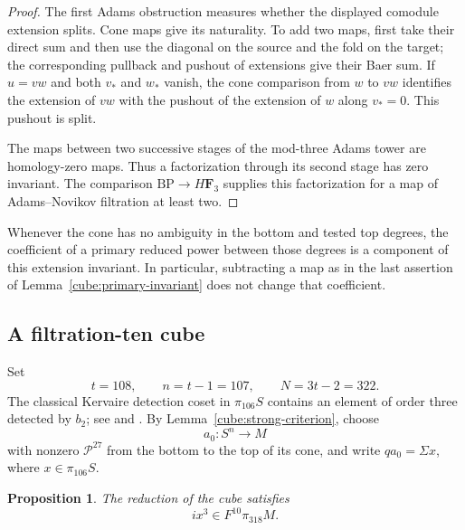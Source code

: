 \documentclass[11pt]{article}
\newtheorem{proposition}[theorem]{Proposition}
\theoremstyle{definition}
\theoremstyle{remark}
\numberwithin{equation}{section}
\begin{document}
\begin{proof}
The first Adams obstruction measures whether the displayed comodule
extension splits.  Cone maps give its naturality.  To add two maps,
first take their direct sum and then use the diagonal on the source
and the fold on the target; the corresponding pullback and pushout of
extensions give their Baer sum.  If \(u=vw\) and both \(v_*\) and
\(w_*\) vanish, the cone comparison from \(w\) to \(vw\) identifies
the extension of \(vw\) with the pushout of the extension of \(w\)
along \(v_*=0\).  This pushout is split.

The maps between two successive stages of the mod-three Adams tower
are homology-zero maps.  Thus a factorization through its second stage
has zero invariant.  The comparison \(\mathrm{BP}\to H\mathbf F_3\) supplies this
factorization for a map of Adams--Novikov filtration at least two.
\end{proof}

Whenever the cone has no ambiguity in the bottom and tested top
degrees, the coefficient of a primary reduced power between those
degrees is a component of this extension invariant.  In particular,
subtracting a map as in the last assertion of
Lemma~\ref{cube:primary-invariant} does not change that coefficient.

\subsection{A filtration-ten cube}

Set
\begin{equation}\label{cube:dimensions}
 t=108,\qquad n=t-1=107,\qquad N=3t-2=322.
\end{equation}
The classical Kervaire detection coset in \(\pi_{106}S\) contains
an element of order three detected by
\(b_2\); see \cite[Corollary~1.2 and its proof]{Amelotte} and
\cite[Table~A3.4]{Ravenel}.  By
Lemma~\ref{cube:strong-criterion}, choose
\[
 a_0:S^n\longrightarrow M
\]
with nonzero \(\mathcal P^{27}\) from the bottom to the top of its cone,
and write \(qa_0=\Sigma x\), where \(x\in\pi_{106}S\).

\begin{proposition}\label{cube:cubic-filtration}
The reduction of the cube satisfies
\[
 ix^3\in F^{10}\pi_{318}M.
\]
\end{proposition}
\end{document}
